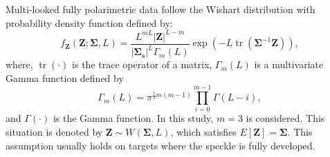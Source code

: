 \documentclass[journal]{IEEEtran}
\DeclareMathOperator{\traco}{tr}
\begin{document}
%
% 
%

Multi-looked fully polarimetric data follow the Wishart distribution with probability density function defined by:
\begin{equation}
    f_{\mathbf{Z}}(\mathbf{Z};\mathbf{\Sigma},L)=\frac{L^{mL}|\mathbf{Z}|^{L-m}}{|\mathbf{\Sigma_{s}}|^{L}\Gamma_m(L)} \exp(-L\traco(\mathbf{\Sigma}^{-1}\mathbf{Z})),
    \label{eq_04}
\end{equation} 
where, $\traco(\cdot)$ is the trace operator of a matrix, $\Gamma_m(L)$ is a multivariate Gamma function defined by
\begin{equation*}
	\Gamma_m(L)=\pi^{\frac{1}{2}m(m-1)} \prod_{i=0}^{m-1}\Gamma(L-i),
\end{equation*}
and $\Gamma(\cdot)$ is the Gamma function.
In this study, $m=3$ is considered. 
This situation is denoted by $\mathbf{Z}\sim W(\mathbf{\Sigma}, L)$, which satisfies $E[\mathbf{Z}]=\mathbf{\Sigma}$. 
This assumption usually holds on targets where the speckle is fully developed.
\end{document}
